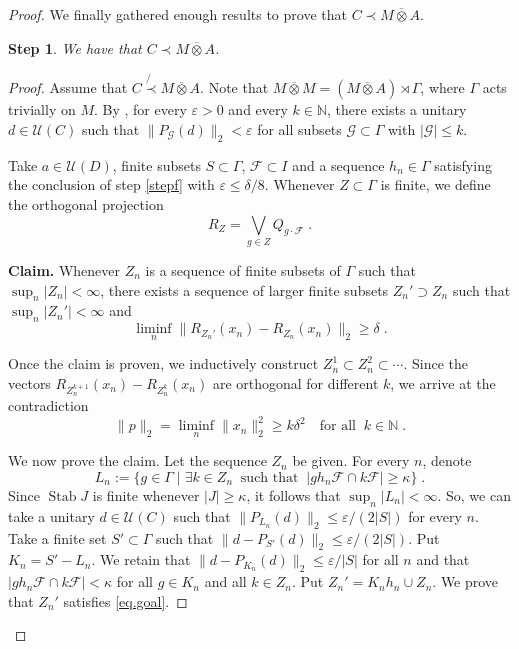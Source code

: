 \documentclass[a4paper,11pt]{amsart}
\numberwithin{equation}{section}
\newtheorem{step}{Step}[section]
\begin{document}
\begin{proof}
We finally gathered enough results to prove that $C \prec M {\mathbin{\overline{\otimes}}} A$.

\begin{step}
We have that $C \prec M {\mathbin{\overline{\otimes}}} A$.
\end{step}

\begin{proof}
Assume that $C \not{\prec} M {\mathbin{\overline{\otimes}}} A$. Note that $M {\mathbin{\overline{\otimes}}} M = (M {\mathbin{\overline{\otimes}}} A) \rtimes \Gamma$, where $\Gamma$ acts trivially on $M$. By \cite[Theorem 1.3.2]{Io10}, for every ${\varepsilon} > 0$ and every $k \in {\mathbb{N}}$, there exists a unitary $d \in {\mathcal{U}}(C)$ such that $\|P_{\mathcal{G}}(d)\|_2 < {\varepsilon}$ for all subsets ${\mathcal{G}} \subset \Gamma$ with $|{\mathcal{G}}| {\leqslant} k$.

Take $a \in {\mathcal{U}}(D)$, finite subsets $S \subset \Gamma$, ${\mathcal{F}} \subset I$ and a sequence $h_n \in \Gamma$ satisfying the conclusion of step \ref{stepf} with ${\varepsilon} {\leqslant} \delta/8$. Whenever $Z \subset \Gamma$ is finite, we define the orthogonal projection
$$R_Z = \bigvee_{g \in Z} Q_{g \cdot {\mathcal{F}}} \; .$$

{\bf Claim.} Whenever $Z_n$ is a sequence of finite subsets of $\Gamma$ such that $\sup_n |Z_n| < \infty$, there exists a sequence of larger finite subsets $Z_n' \supset Z_n$ such that $\sup_n |Z_n'| < \infty$ and
\begin{equation}\label{eq.goal}
\liminf_n \| R_{Z_n'}(x_n) - R_{Z_n}(x_n)\|_2 {\geqslant} \delta \; .
\end{equation}

Once the claim is proven, we inductively construct $Z_n^1 \subset Z_n^2 \subset \cdots$. Since the vectors $R_{Z_n^{k+1}}(x_n) - R_{Z_n^k}(x_n)$ are orthogonal for different $k$, we arrive at the contradiction
$$\|p\|_2 = \liminf_n \|x_n\|_2^2 {\geqslant} k \delta^2 \quad\text{for all}\;\; k \in {\mathbb{N}} \; .$$

We now prove the claim. Let the sequence $Z_n$ be given.
For every $n$, denote $$L_n := \{g \in \Gamma \mid \exists k \in Z_n \;\;\text{such that}\;\; |g h_n {\mathcal{F}} \cap k {\mathcal{F}}| {\geqslant} \kappa\} \; .$$
Since ${\operatorname{Stab}} J$ is finite whenever $|J| {\geqslant} \kappa$, it follows that $\sup_n |L_n| < \infty$. So, we can take a unitary $d \in {\mathcal{U}}(C)$ such that $\|P_{L_n}(d)\|_2 {\leqslant} {\varepsilon}/(2|S|)$ for every $n$. Take a finite set $S'\subset \Gamma$ such that $\|d - P_{S'}(d)\|_2 {\leqslant} {\varepsilon}/(2|S|)$. Put $K_n = S'-L_n$. We retain that $\|d - P_{K_n}(d)\|_2 {\leqslant} {\varepsilon}/|S|$ for all $n$ and that $|g h_n {\mathcal{F}} \cap k {\mathcal{F}}| < \kappa$ for all $g \in K_n$ and all $k \in Z_n$. Put $Z_n' = K_n h_n \cup Z_n$. We prove that $Z_n'$ satisfies \eqref{eq.goal}.


\end{proof}
\end{proof}
\end{document}
